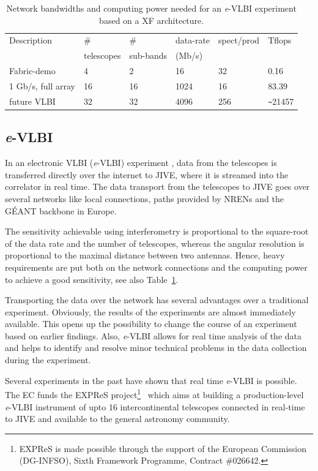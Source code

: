 \begin{table}
  \centering
  \begin{tabular}[c]{|l|l|l|l|l|l|}
    \hline
    Description & \# & \#  & data-rate & spect/prod & Tflops\\
    & telescopes & sub-bands & (Mb/s) &  & \\
    \hline
    \hline
    Fabric-demo &4 &2 &16 &32 &0.16\\
    1 Gb/s, full array  &16 &16 &1024 &16 &83.39\\
    future VLBI &32 &32 &4096 &256 &\verb|~|21457\\
    \hline
  \end{tabular}
  \caption{Network bandwidths and computing power needed for an {\it e}-VLBI
    experiment based on a XF architecture.}
  \label{tab:speed}
\end{table}
\subsection{{\it e}-VLBI}
In an electronic VLBI ({\it e}-VLBI) experiment \cite{szomoru-2004},
data from the telescopes is transferred directly over the internet to
JIVE, where it is streamed into the correlator in real time. The data
transport from the telescopes to JIVE goes over several networks like
local connections, paths provided by NRENs and the G\'EANT backbone in
Europe.

The sensitivity achievable using interferometry is proportional to the
square-root of the data rate and the number of telescopes, whereas the
angular resolution is proportional to the maximal distance between two
antennas. Hence, heavy requirements are put both on the network
connections and the computing power to achieve a good sensitivity, see
also Table~\ref{tab:speed}.

Transporting the data over the network has several advantages over a
traditional experiment. Obviously, the results of the experiments are
almost immediately available. This opens up the possibility to change
the course of an experiment based on earlier findings. Also, {\it
  e}-VLBI allows for real time analysis of the data and helps to
identify and resolve minor technical problems in the data collection
during the experiment.

Several experiments in the past have shown that real time {\it e}-VLBI
is possible. The EC funds the EXPReS project\footnote{EXPReS is made
  possible through the support of the European Commission (DG-INFSO),
  Sixth Framework Programme, Contract \#026642.}~\cite{EXPReS} which
aims at building a production-level {\it e}-VLBI instrument of upto 16
intercontinental telescopes connected in real-time to JIVE and
available to the general astronomy community.


